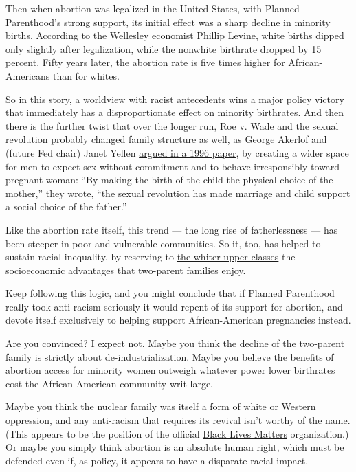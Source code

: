 Then when abortion was legalized in the United States, with Planned
Parenthood's strong support, its initial effect was a sharp decline in
minority births. According to the Wellesley economist Phillip Levine,
white births dipped only slightly after legalization, while the nonwhite
birthrate dropped by 15 percent. Fifty years later, the abortion rate is
\href{https://www.theatlantic.com/health/archive/2014/09/abortions-racial-gap/380251/}{five
times} higher for African-Americans than for whites.

So in this story, a worldview with racist antecedents wins a major
policy victory that immediately has a disproportionate effect on
minority birthrates. And then there is the further twist that over the
longer run, Roe v. Wade and the sexual revolution probably changed
family structure as well, as George Akerlof and (future Fed chair) Janet
Yellen
\href{https://www.brookings.edu/research/an-analysis-of-out-of-wedlock-births-in-the-united-states/}{argued
in a 1996 paper}, by creating a wider space for men to expect sex
without commitment and to behave irresponsibly toward pregnant woman:
``By making the birth of the child the physical choice of the mother,''
they wrote, ``the sexual revolution has made marriage and child support
a social choice of the father.''

Like the abortion rate itself, this trend --- the long rise of
fatherlessness --- has been steeper in poor and vulnerable communities.
So it, too, has helped to sustain racial inequality, by reserving to
\href{https://douthat.blogs.nytimes3xbfgragh.onion/2014/01/29/social-liberalism-as-class-warfare/}{the
whiter upper classes} the socioeconomic advantages that two-parent
families enjoy.

Keep following this logic, and you might conclude that if Planned
Parenthood really took anti-racism seriously it would repent of its
support for abortion, and devote itself exclusively to helping support
African-American pregnancies instead.

Are you convinced? I expect not. Maybe you think the decline of the
two-parent family is strictly about de-industrialization. Maybe you
believe the benefits of abortion access for minority women outweigh
whatever power lower birthrates cost the African-American community writ
large.

Maybe you think the nuclear family was itself a form of white or Western
oppression, and any anti-racism that requires its revival isn't worthy
of the name. (This appears to be the position of the official
\href{https://blacklivesmatter.com/what-we-believe/}{Black Lives
Matters} organization.) Or maybe you simply think abortion is an
absolute human right, which must be defended even if, as policy, it
appears to have a disparate racial impact.

